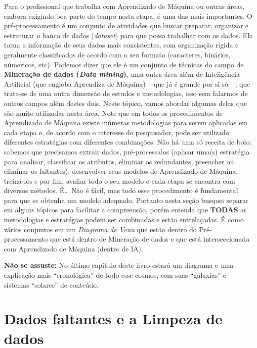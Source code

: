 \documentclass[
  openany]{book}
\begin{document}
Para o profissional que trabalha com Aprendizado de Máquina ou outras áreas, embora exigindo boa parte do tempo nesta etapa, é uma das mais importantes. O pré-processamento é um conjunto de atividades que buscar preparar, organizar e estruturar o banco de dados (\emph{dataset}) para que possa trabalhar com os dados. Ela torna a informação de seus dados mais consistentes, com organização rígida e geralmente classificados de acordo com o seu formato (caracteres, binários, númericos, etc). Podemos dizer que ele é um conjunto de técnicas do campo de \textbf{Mineração de dados (\emph{Data mining})}, uma outra área além de Inteligência Artificial (que engloba Aprendiza de Máquina) -- que já é grande por si só - , que trata-se de uma outra dimensão de estudos e metodologias, isso sem falarmos de outros campos além destes dois. Neste tópico, vamos abordar algumas delas que são muito utilizadas nesta área. Note que em todos os procedimentos de Aprendizado de Máquina existe inúmeras metodologias para serem aplicadas em cada etapa e, de acordo com o interesse do pesquisador, pode ser utilizado diferentes estratégias com diferentes combinações. Não há uma só receita de bolo: sabemos que precisamos extrair dados, pré-processalos (aplicar uma(s) estratégia para analisar, classificar os atributos, eliminar os redundantes, preencher ou eliminar os faltantes), desenvolver seus modelos de Aprendizado de Máquina, treiná-los e por fim, avaliar todo o seu modelo e cada etapa se encontra com diversos métodos. É\ldots{} Não é fácil, mas todo esse procedimento é fundamental para que se obtenha um modelo adequado. Portanto nesta seção busquei separar em alguns tópicos para facilitar a compreensão, porém entenda que \textbf{TODAS} as metodologias e estratégias podem ser combinadas e estão entrelaçadas. É como vários conjuntos em um \emph{Diagrama de Venn} que estão dentro do Pré-processamento que está dentro de Mineração de dados e que está interseccionada com Aprendizado de Máquina (dentro de IA).

\textbf{Não se assuste:} No último capítulo deste livro estará um diagrama e uma explicação mais ``cronológica'' de todo esse cosmos, com suas ``gálaxias'' e sistemas ``solares'' de conteúdo.

\hypertarget{dados-faltantes-e-a-limpeza-de-dados}{%
\section{Dados faltantes e a Limpeza de dados}\label{dados-faltantes-e-a-limpeza-de-dados}}
\end{document}
